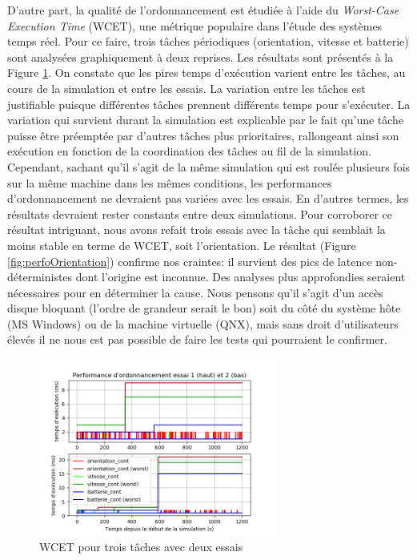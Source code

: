 \documentclass[journal]{IEEEtran}
\begin{document}
D'autre part, la qualité de l'ordonnancement est étudiée à l'aide du \textit{Worst-Case Execution Time} (WCET), une métrique populaire dans l'étude des systèmes temps réel. Pour ce faire, trois tâches périodiques (orientation, vitesse et batterie) sont analysées graphiquement à deux reprises. Les résultats sont présentés à la Figure \ref{fig:perfoTrois}. On constate que les pires temps d'exécution varient entre les tâches, au cours de la simulation et entre les essais. La variation entre les tâches est justifiable puisque différentes tâches prennent différents temps pour s'exécuter. La variation qui survient durant la simulation est explicable par le fait qu'une tâche puisse être préemptée par d'autres tâches plus prioritaires, rallongeant ainsi son exécution en fonction de la coordination des tâches au fil de la simulation. Cependant, sachant qu'il s'agit de la même simulation qui est roulée plusieurs fois sur la même machine dans les mêmes conditions, les performances d'ordonnancement ne devraient pas variées avec les essais. En d'autres termes, les résultats devraient rester constants entre deux simulations. Pour corroborer ce résultat intriguant, nous avons refait trois essais avec la tâche qui semblait la moins stable en terme de WCET, soit l'orientation. Le résultat (Figure \ref{fig:perfoOrientation}) confirme nos craintes: il survient des pics de latence non-déterministes dont l'origine est inconnue. Des analyses plus approfondies seraient nécessaires pour en déterminer la cause. Nous pensons qu'il s'agit d'un accès disque bloquant (l'ordre de grandeur serait le bon) soit du côté du système hôte (MS Windows) ou de la machine virtuelle (QNX), mais sans droit d'utilisateurs élevés il ne nous est pas possible de faire les tests qui pourraient le confirmer.

\begin{figure}
	\centering
	\captionsetup{justification=centering}
	\includegraphics[width=220pt]{csv_try_1_2.png}
	\caption{WCET pour trois tâches avec deux essais}
	\label{fig:perfoTrois}
\end{figure}
\end{document}
